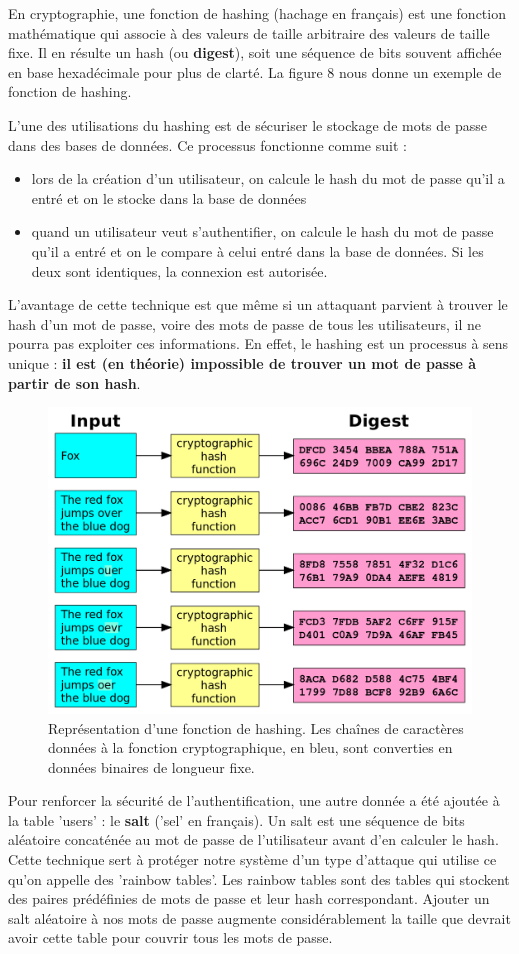 \documentclass[french]{article}
\begin{document}
    En cryptographie, une fonction de hashing (hachage en français) est une fonction mathématique qui associe à des valeurs de taille arbitraire des valeurs de taille fixe. Il en résulte un hash (ou \textbf{digest}), soit une séquence de bits souvent affichée en base hexadécimale pour plus de clarté. La figure 8 nous donne un exemple de fonction de hashing.

    L'une des utilisations du hashing est de sécuriser le stockage de mots de passe dans des bases de données. Ce processus fonctionne comme suit :
    \begin{itemize}
        \item lors de la création d'un utilisateur, on calcule le hash du mot de passe qu'il a entré et on le stocke dans la base de données
        \item quand un utilisateur veut s'authentifier, on calcule le hash du mot de passe qu'il a entré et on le compare à celui entré dans la base de données. Si les deux sont identiques, la connexion est autorisée.
    \end{itemize} 
    L'avantage de cette technique est que même si un attaquant parvient à trouver le hash d'un mot de passe, voire des mots de passe de tous les utilisateurs, il ne pourra pas exploiter ces informations. En effet, le hashing est un processus à sens unique : \textbf{il est (en théorie) impossible de trouver un mot de passe à partir de son hash}.
    \begin{figure}[h!]
        \includegraphics[width=12cm]{hashing}
        \centering
        \caption{Représentation d'une fonction de hashing. Les chaînes de caractères données à la fonction cryptographique, en bleu, sont converties en données binaires de longueur fixe.}
        \centering
    \end{figure}
    Pour renforcer la sécurité de l'authentification, une autre donnée a été ajoutée à la table 'users' : le \textbf{salt} ('sel' en français). Un salt est une séquence de bits aléatoire concaténée au mot de passe de l'utilisateur avant d'en calculer le hash. Cette technique sert à protéger notre système d'un type d'attaque qui utilise ce qu'on appelle des 'rainbow tables'. Les rainbow tables sont des tables qui stockent des paires prédéfinies de mots de passe et leur hash correspondant. Ajouter un salt aléatoire à nos mots de passe augmente considérablement la taille que devrait avoir cette table pour couvrir tous les mots de passe.
    
\end{document}
